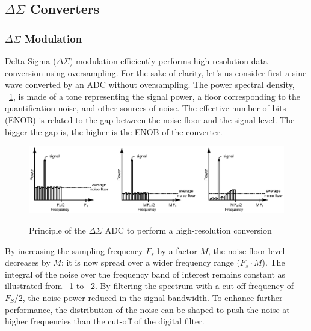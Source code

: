 \subsection{\(\Delta\Sigma \) Converters}      %
\label{sec:sd-isd-adc}
\subsubsection{\(\Delta\Sigma \) Modulation}
Delta-Sigma (\(\Delta\Sigma \)) modulation efficiently performs high-resolution data conversion using oversampling. For the sake of clarity, let's us consider first a sine wave converted by an ADC without oversampling. The power spectral density, \figurename~\ref{fig:spectrum-sine-nyquist}, is made of a tone representing the signal power, a floor corresponding to the quantification noise, and other sources of noise. The effective number of bits (ENOB) is related to the gap between the noise floor and the signal level. The bigger the gap is, the higher is the ENOB of the converter.

\begin{figure}[htp]
	\centering
	\includegraphics[width=\textwidth]{Chapter2/Figs/Vector/sd-noise-shaping.ps}
	\begin{subfigure}[b]{0.33\textwidth}
		\label{fig:spectrum-sine-nyquist}
	\end{subfigure}
	\begin{subfigure}[b]{0.33\textwidth}
		\label{fig:spectrum-sine-oversampling}
	\end{subfigure}
	\begin{subfigure}[b]{0.33\textwidth}
	\end{subfigure}
	\caption{Principle of the $\Delta \Sigma$ ADC to perform a high-resolution conversion}
	\label{}
\end{figure}

By increasing the sampling frequency $F_s$ by a factor $M$, the noise floor level decreases by $M$; it is now spread over a wider frequency range ($F_s \cdot M$). The integral of the noise over the frequency band of interest remains constant as illustrated from \figurename~\ref{fig:spectrum-sine-nyquist} to \figurename~\ref{fig:spectrum-sine-oversampling}. By filtering the spectrum with a cut off frequency of $F_S/2$, the noise power reduced in the signal bandwidth. To enhance further performance, the distribution of the noise can be shaped to push the noise at higher frequencies than the cut-off of the digital filter.

